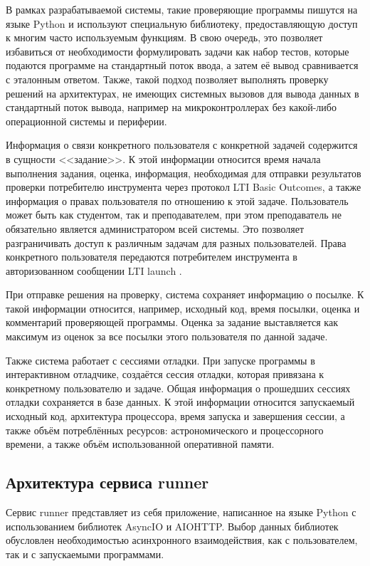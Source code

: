 \documentclass[a4paper,article,14pt]{extarticle}
\begin{document}
В рамках разрабатываемой системы, такие проверяющие программы пишутся на языке Python и используют специальную библиотеку, предоставляющую доступ к многим часто используемым функциям. В свою очередь, это позволяет избавиться от необходимости формулировать задачи как набор тестов, которые подаются программе на стандартный поток ввода, а затем её вывод сравнивается с эталонным ответом. Также, такой подход позволяет выполнять проверку решений на архитектурах, не имеющих системных вызовов для вывода данных в стандартный поток вывода, например на микроконтроллерах без какой-либо операционной системы и периферии.

Информация о связи конкретного пользователя с конкретной задачей содержится в сущности <<задание>>. К этой информации относится время начала выполнения задания, оценка, информация, необходимая для отправки результатов проверки потребителю инструмента через протокол LTI Basic Outcomes, а также информация о правах пользователя по отношению к этой задаче. Пользователь может быть как студентом, так и преподавателем, при этом преподаватель не обязательно является администратором всей системы. Это позволяет разграничивать доступ к различным задачам для разных пользователей. Права конкретного пользователя передаются потребителем инструмента в авторизованном сообщении LTI launch \cite{lti}.

При отправке решения на проверку, система сохраняет информацию о посылке. К такой информации относится, например, исходный код, время посылки, оценка и комментарий проверяющей программы. Оценка за задание выставляется как максимум из оценок за все посылки этого пользователя по данной задаче.

Также система работает с сессиями отладки. При запуске программы в интерактивном отладчике, создаётся сессия отладки, которая привязана к конкретному пользователю и задаче. Общая информация о прошедших сессиях отладки сохраняется в базе данных. К этой информации относится запускаемый исходный код, архитектура процессора, время запуска и завершения сессии, а также объём потреблённых ресурсов: астрономического и процессорного времени, а также объём использованной оперативной памяти.

\subsection{Архитектура сервиса runner}

Сервис runner представляет из себя приложение, написанное на языке Python с использованием библиотек AsyncIO и AIOHTTP. Выбор данных библиотек обусловлен необходимостью асинхронного взаимодействия, как с пользователем, так и с запускаемыми программами.
\end{document}
